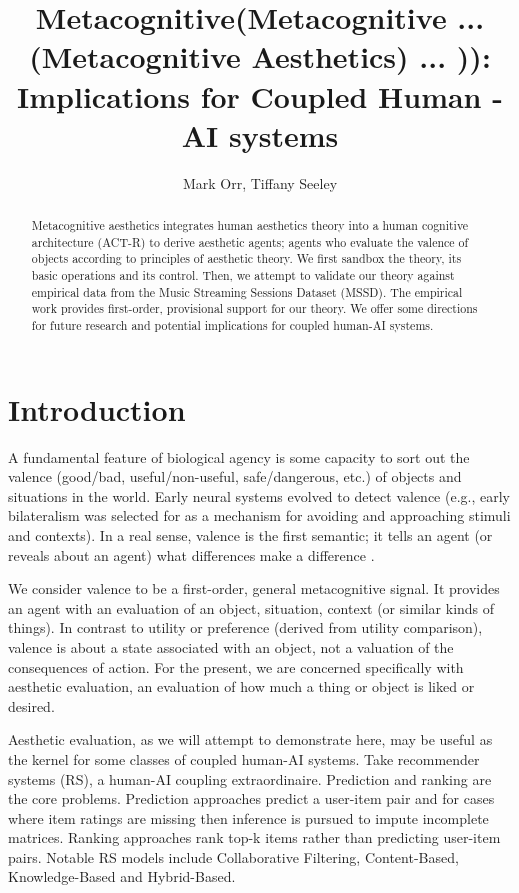 \documentclass[letterpaper]{article} %
\title{Metacognitive(Metacognitive ... (Metacognitive Aesthetics) ... )): \\Implications for Coupled Human - AI systems}
\author{
    Mark Orr, Tiffany Seeley
}
\begin{document}
\maketitle

\begin{abstract}
Metacognitive aesthetics integrates human aesthetics theory into a human cognitive architecture (ACT-R) to derive aesthetic agents; agents who evaluate the valence of objects according to principles of aesthetic theory.  We first sandbox the theory, its basic operations and its control.  Then, we attempt to validate our theory against empirical data from the Music Streaming Sessions Dataset (MSSD). The empirical work provides first-order, provisional support for our theory.  We offer some directions for future research and potential implications for coupled human-AI systems.  
\end{abstract}

\section{Introduction}
A fundamental feature of biological agency is some capacity to sort out the valence (good/bad, useful/non-useful, safe/dangerous, etc.) of objects and situations in the world.  Early neural systems evolved to detect valence (e.g., early bilateralism was selected for as a mechanism for avoiding and approaching stimuli and contexts).  In a real sense, valence is the first semantic; it tells an agent (or reveals about an agent) what differences make a difference \cite{dennett2017bacteria}.  

We consider valence to be a first-order, general metacognitive signal.  It provides an agent with an evaluation of an object, situation, context (or similar kinds of things).  In contrast to utility or preference (derived from utility comparison), valence is about a state associated with an object, not a valuation of the consequences of action.   For the present, we are concerned specifically with aesthetic evaluation, an evaluation of how much a thing or object is liked or desired.  

Aesthetic evaluation, as we will attempt to demonstrate here, may be useful as the kernel for some classes of coupled human-AI systems.  Take recommender systems (RS), a human-AI coupling extraordinaire. 
Prediction and ranking are the core problems. Prediction approaches predict a user-item pair and for cases where item ratings are missing then inference is pursued to impute incomplete matrices. Ranking approaches rank top-k items rather than predicting user-item pairs. Notable RS models include Collaborative Filtering, Content-Based, Knowledge-Based and Hybrid-Based. \cite{aggarwal2016model}
\end{document}

